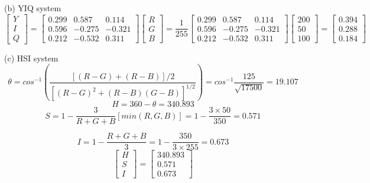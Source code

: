 \documentclass[12pt]{article}
\begin{document}
\noindent(b) YIQ system
\begin{equation*}
{\left[ \begin{array}{c}
Y\\
I\\
Q
\end{array} 
\right]} = {\left[ \begin{array}{ccc}
0.299 & 0.587 & 0.114\\
0.596 & -0.275 & -0.321\\
0.212 & -0.532 & 0.311
\end{array} 
\right]}  
{\left[ \begin{array}{c}
R\\
G\\
B
\end{array} 
\right]} = 
\frac{1}{255}
{\left[ \begin{array}{ccc}
0.299 & 0.587 & 0.114\\
0.596 & -0.275 & -0.321\\
0.212 & -0.532 & 0.311
\end{array} 
\right]} {\left[ \begin{array}{c}
200\\
50\\
100
\end{array} 
\right]} 
={\left[ \begin{array}{c}
0.394\\ 
0.288\\
0.184
\end{array} 
\right]}
\end{equation*}

\noindent(c) HSI system
\begin{equation*}
\theta = cos^{-1}\left(\frac{[(R-G)+(R-B)]/2}{[(R-G)^2+(R-B)(G-B)]^{1/2}}\right)=cos^{-1}\frac{125}{\sqrt{17500}}=19.107
\end{equation*}
\begin{equation*}
H = 360 - \theta = 340.893
\end{equation*}
\begin{equation*}
S = 1-\frac{3}{R+G+B}[min(R, G, B)] = 1- \frac{3\times50}{350} = 0.571
\end{equation*}

\begin{equation*}
I = 1-\frac{R+G+B}{3} = 1-\frac{350}{3\times255} = 0.673
\end{equation*}
\begin{equation*}
{\left[ \begin{array}{c}
H\\ 
S\\
I
\end{array} 
\right]} = {\left[ \begin{array}{c}
340.893\\ 
0.571\\
0.673
\end{array} 
\right]}
\end{equation*}
\end{document}
